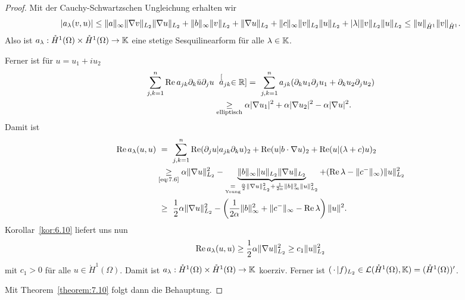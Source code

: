 \begin{proof}
  Mit der Cauchy-Schwartzschen Ungleichung erhalten wir
  \begin{dmath*}
    \abs{a_\lambda(v,u)}\leq\norm{a}_\infty\norm{\nabla v}_{L_2}\norm{\nabla u}_{L_2}+\norm{b}_\infty\norm{v}_{L_2}+\norm{\nabla u}_{L_2}+\norm{c}_\infty\norm{v}_{L_2}\norm{u}_{L_2}+\abs\lambda\norm{v}_{L_2}\norm{u}_{L_2}
  \leq\norm{u}_{\mathring H^1}\norm{v}_{\mathring H^1}.
  \end{dmath*}
  Also ist $a_\lambda:\mathring H^1(\Omega)\times\mathring H^1(\Omega)\rightarrow\mathbb{K}$ eine stetige Sesquilinearform für alle $\lambda\in\mathbb{K}$.

  Ferner ist für $u=u_1+iu_2$
  \begin{align}
  \label{eq:7.6}
  \begin{aligned}
    \sum_{j,k=1}^n\Re a_{jk}\partial_k\bar u\partial_j u
   &\  \stackrel[a_{jk}\in \mathbb{R}]{}= \ \sum_{j,k=1}^na_{jk}(\partial_ku_1\partial_ju_1+\partial_ku_2\partial_ju_2)\\
  & \underset{\scriptsize\text{elliptisch}}\geq \alpha\abs{\nabla u_1}^2+\alpha\abs{\nabla u_2}^2-\alpha\abs{\nabla u}^2.
    \end{aligned}
  \end{align}
  Damit ist
  \begin{align*}
    \operatorname{Re} a_\lambda(u,u)& \ = \ \sum_{j,k=1}^n\operatorname{Re} (\partial_ju\vert a_{jk}\partial_k u)_2+\operatorname{Re}(u\vert b\cdot\nabla u)_2
    +\operatorname{Re}(u\vert (\lambda+c)u)_2 \\
 &   \underset{\scriptsize\eqref{eq:7.6}}\geq\alpha\lVert \nabla u\rVert_{L_2}^2
    -\underbrace{\lVert b\rVert_\infty\lVert u\rVert_{L_2}\lVert \nabla u\rVert_{L_2}}_{
      \underset{\text{Young}}=\frac \alpha2\lVert \nabla u\rVert^2_{L_2}+\frac1{2\alpha}\lVert b\rVert_\infty^2\lVert u\rVert_{L_2}^2
    }+(\operatorname{Re}\lambda-\lVert c^-\rVert_\infty)\lVert u\rVert_{L_2}^2  \\
    & \ \geq\ \frac 12\alpha\lVert \nabla u\rVert_{L_2}^2-\left(
      \frac 1{2\alpha}\lVert b\rVert_\infty^2+\lVert c^-\rVert_\infty-\operatorname{Re}\lambda
    \right)\lVert u\rVert^2.
  \end{align*}
  Korollar~\ref{kor:6.10} liefert uns nun
  \[ \operatorname{Re} a_\lambda(u,u)\geq\frac 12\alpha\lVert \nabla u\rVert_{L_2}^2\geq c_1\lVert u\rVert_{L_2}^2 \]
  mit $c_1>0$ für alle $u\in\mathring H^1(\Omega)$. Damit ist $a_\lambda:\mathring H^1(\Omega)\times\mathring H^1(\Omega)\rightarrow\mathbb{K}$ koerziv. Ferner ist $(\, \cdot\, \vert f)_{L_2}\in\mathcal{L}(\mathring H^1(\Omega),\mathbb{K})=(\mathring H^1(\Omega))'$.

  Mit Theorem~\ref{theorem:7.10} folgt dann die Behauptung.
\end{proof}

